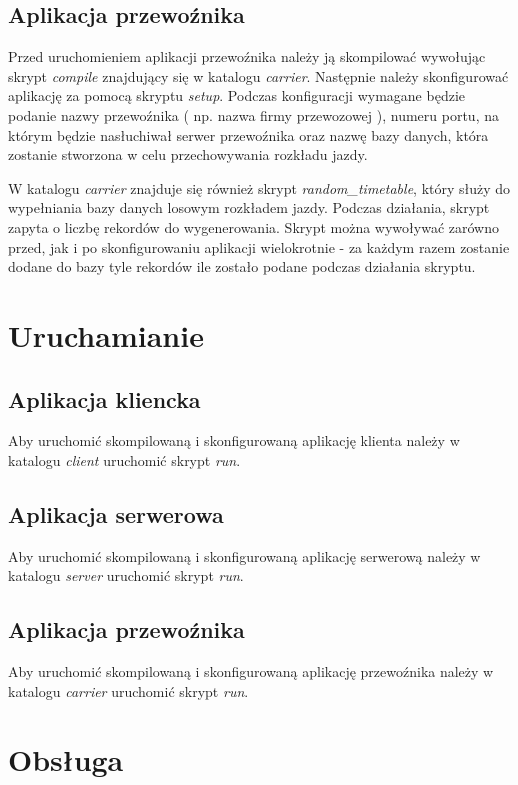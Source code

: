 \documentclass[pdftex,13pt,a4paper]{article}
\begin{document}
\subsection{Aplikacja przewoźnika}

	Przed uruchomieniem aplikacji przewoźnika należy ją skompilować wywołując skrypt \emph{compile} znajdujący się w katalogu \emph{carrier}. Następnie należy skonfigurować aplikację za pomocą skryptu \emph{setup}. Podczas konfiguracji wymagane będzie podanie nazwy przewoźnika ( np. nazwa firmy przewozowej ), numeru portu, na którym będzie nasłuchiwał serwer przewoźnika oraz nazwę bazy danych, która zostanie stworzona w celu przechowywania rozkładu jazdy.
	
	W katalogu \emph{carrier} znajduje się również skrypt \emph{random\_timetable}, który służy do wypełniania bazy danych losowym rozkładem jazdy. Podczas działania, skrypt zapyta o liczbę rekordów do wygenerowania. Skrypt można wywoływać zarówno przed, jak i po skonfigurowaniu aplikacji wielokrotnie - za każdym razem zostanie dodane do bazy tyle rekordów ile zostało podane podczas działania skryptu.

\section{Uruchamianie}

\subsection{Aplikacja kliencka}
	Aby uruchomić skompilowaną i skonfigurowaną aplikację klienta należy w katalogu \emph{client} uruchomić skrypt \emph{run}.

\subsection{Aplikacja serwerowa}
	Aby uruchomić skompilowaną i skonfigurowaną aplikację serwerową należy w katalogu \emph{server} uruchomić skrypt \emph{run}.

\subsection{Aplikacja przewoźnika}
	Aby uruchomić skompilowaną i skonfigurowaną aplikację przewoźnika należy w katalogu \emph{carrier} uruchomić skrypt \emph{run}.

\section{Obsługa}
\end{document}
